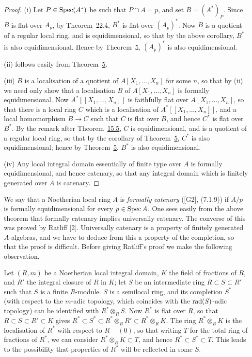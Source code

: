 \begin{proof}
(i) Let $P \in \operatorname{Spec}(A^*)$ be such that $P \cap A = p$, and set $B = (A^*)_P$.
Since $B$ is flat over $A_p$, by Theorem~\hyperref[thm:22.4]{22.4}, $B^*$ is flat over $(A_p)^*$. Now $B$ is
a quotient of a regular local ring, and is equidimensional, so that by the above
corollary, $B^*$ is also equidimensional. Hence by Theorem~\hyperref[thm:31.5]{5}, $(A_p)^*$ is also
equidimensional.

(ii) follows easily from Theorem~\hyperref[thm:31.5]{5}.

(iii) $B$ is a localisation of a quotient of $A[X_1, \ldots, X_n]$ for some $n$, so that
by (ii) we need only show that a localisation $B$ of $A[X_1, \ldots, X_n]$ is formally
equidimensional. Now $A^*[[X_1, \ldots, X_n]]$ is faithfully flat over
$A[X_1, \ldots, X_n]$, so that there is a local ring $C$ which is a localisation of
$A^*[[X_1, \ldots, X_n]]$, and a local homomorphism $B \to C$ such that $C$ is flat over
$B$, and hence $C^*$ is flat over $B^*$. By the remark after Theorem~\hyperref[thm:15.5]{15.5}, $C$ is
equidimensional, and is a quotient of a regular local ring, so that by the
corollary of Theorem~\hyperref[thm:31.5]{5}, $C^*$ is also equidimensional; hence by
Theorem~\hyperref[thm:31.5]{5}, $B^*$ is also equidimensional.

(iv) Any local integral domain essentially of finite type over $A$ is formally
equidimensional, and hence catenary, so that any integral domain which is
finitely generated over $A$ is catenary.
\end{proof}

We say that a Noetherian local ring $A$ is \emph{formally catenary} ([G2], (7.1.9)) if
$A/p$ is formally equidimensional for every $p \in \operatorname{Spec} A$. One sees easily from the
above theorem that formally catenary implies universally catenary. The converse
of this was proved by Ratliff [2]. Universally catenary is a property of finitely
generated $A$-algebras, and we have to deduce from this a property of the
completion, so that the proof is difficult. Before giving Ratliff's proof we make
the following observation.

Let $(R, m)$ be a Noetherian local integral domain, $K$ the field of fractions of $R$,
and $R'$ the integral closure of $R$ in $K$; let $S$ be an intermediate ring
$R \subset S \subset R'$ such that $S$ is a finite $R$-module. $S$ is a semilocal ring, and its
completion $S^*$ (with respect to the $m$-adic topology, which coincides with the
$\operatorname{rad}(S)$-adic topology) can be identified with $R^* \otimes_R S$. Now $R^*$ is flat over
$R$, so that $R \subset S \subset R' \subset K$ gives
$R^* \subset S^* \subset R^* \otimes_R R' \subset R^* \otimes_R K$. The ring $R^* \otimes_R K$ is the
localisation of $R^*$ with respect to $R - (0)$, so that writing $T$ for the total ring of
fractions of $R^*$, we can consider $R^* \otimes_R K \subset T$, and hence
$R^* \subset S^* \subset T$. This leads to the possibility that properties of $R^*$ will be
reflected in some $S$.

